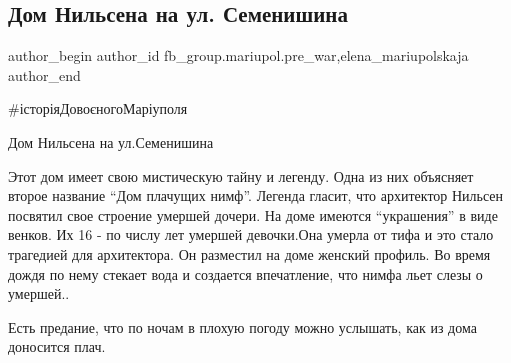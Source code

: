  
 
 
 
 

\subsection{Дом Нильсена на ул. Семенишина}
\label{sec:10_02_2023.fb.fb_group.mariupol.pre_war.3.dom_nilsena_na_ul__s}
 
\ifcmt
 author_begin
   author_id fb_group.mariupol.pre_war,elena_mariupolskaja
 author_end
\fi

\#історіяДовоєногоМаріуполя

Дом Нильсена на ул.Семенишина

Этот дом имеет свою мистическую тайну и легенду. Одна из них объясняет второе
название \enquote{Дом плачущих нимф}. Легенда гласит, что архитектор Нильсен посвятил
свое строение умершей дочери. На доме имеются \enquote{украшения} в виде венков. Их 16
- по числу лет умершей девочки.Она умерла от тифа и это стало трагедией для
архитектора. Он разместил на доме  женский профиль. Во время дождя по нему
стекает вода  и создается впечатление, что нимфа льет слезы о умершей..

Есть предание, что по ночам в плохую погоду можно услышать, как из дома
доносится плач.

